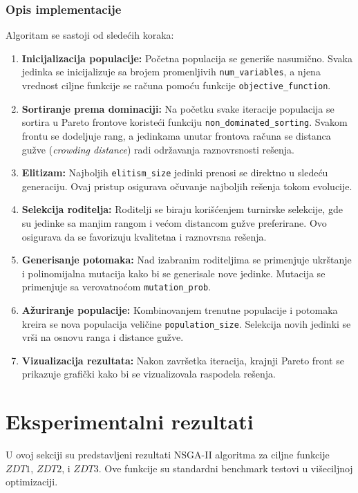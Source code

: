 \documentclass[12pt]{article}
\begin{document}
\subsubsection*{Opis implementacije}
Algoritam se sastoji od sledećih koraka:
\begin{enumerate}
    \item \textbf{Inicijalizacija populacije:} 
    Početna populacija se generiše nasumično. Svaka jedinka se inicijalizuje sa brojem promenljivih \texttt{num\_variables}, a njena vrednost ciljne funkcije se računa pomoću funkcije \texttt{objective\_function}.
    
    \item \textbf{Sortiranje prema dominaciji:} 
    Na početku svake iteracije populacija se sortira u Pareto frontove koristeći funkciju \texttt{non\_dominated\_sorting}. Svakom frontu se dodeljuje rang, a jedinkama unutar frontova računa se distanca gužve (\textit{crowding distance}) radi održavanja raznovrsnosti rešenja.
    
    \item \textbf{Elitizam:} 
    Najboljih \texttt{elitism\_size} jedinki prenosi se direktno u sledeću generaciju. Ovaj pristup osigurava očuvanje najboljih rešenja tokom evolucije.
    
    \item \textbf{Selekcija roditelja:} 
    Roditelji se biraju korišćenjem turnirske selekcije, gde su jedinke sa manjim rangom i većom distancom gužve preferirane. Ovo osigurava da se favorizuju kvalitetna i raznovrsna rešenja.
    
    \item \textbf{Generisanje potomaka:} 
    Nad izabranim roditeljima se primenjuje ukrštanje i polinomijalna mutacija kako bi se generisale nove jedinke. Mutacija se primenjuje sa verovatnoćom \texttt{mutation\_prob}.
    
    \item \textbf{Ažuriranje populacije:} 
    Kombinovanjem trenutne populacije i potomaka kreira se nova populacija veličine \texttt{population\_size}. Selekcija novih jedinki se vrši na osnovu ranga i distance gužve.
    
    \item \textbf{Vizualizacija rezultata:} 
    Nakon završetka iteracija, krajnji Pareto front se prikazuje grafički kako bi se vizualizovala raspodela rešenja.
\end{enumerate}

\section{Eksperimentalni rezultati}
U ovoj sekciji su predstavljeni rezultati NSGA-II algoritma za ciljne funkcije \( ZDT1 \), \( ZDT2 \), i \( ZDT3 \). Ove funkcije su standardni benchmark testovi u višeciljnoj optimizaciji.
\end{document}
